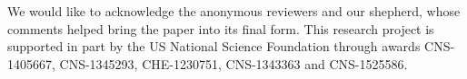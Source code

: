We would like to acknowledge the anonymous
reviewers and our shepherd, whose comments helped
bring the paper into its final form. 
This research project is supported in part 
by the US National Science Foundation
through awards CNS-1405667, CNS-1345293, CHE-1230751, 
CNS-1343363 and CNS-1525586.

